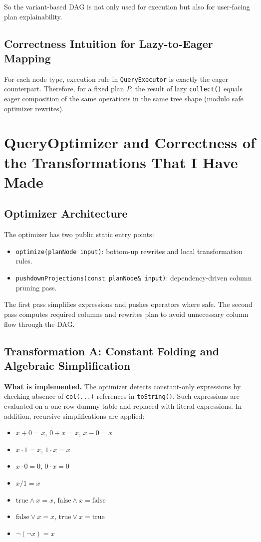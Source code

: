 \documentclass[11pt,a4paper]{article}
\begin{document}
So the variant-based DAG is not only used for execution but also for user-facing plan explainability.

\subsection{Correctness Intuition for Lazy-to-Eager Mapping}
For each node type, execution rule in \texttt{QueryExecutor} is exactly the eager counterpart. Therefore, for a fixed plan \(P\), the result of lazy \texttt{collect()} equals eager composition of the same operations in the same tree shape (modulo safe optimizer rewrites).

\section{QueryOptimizer and Correctness of the Transformations That I Have Made}

\subsection{Optimizer Architecture}
The optimizer has two public static entry points:
\begin{itemize}[leftmargin=*]
	\item \texttt{optimize(planNode input)}: bottom-up rewrites and local transformation rules.
	\item \texttt{pushdownProjections(const planNode\& input)}: dependency-driven column pruning pass.
\end{itemize}

The first pass simplifies expressions and pushes operators where safe. The second pass computes required columns and rewrites plan to avoid unnecessary column flow through the DAG.

\subsection{Transformation A: Constant Folding and Algebraic Simplification}

\textbf{What is implemented.}
The optimizer detects constant-only expressions by checking absence of \texttt{col(...)} references in \texttt{toString()}. Such expressions are evaluated on a one-row dummy table and replaced with literal expressions. In addition, recursive simplifications are applied:
\begin{itemize}[leftmargin=*]
	\item \(x + 0 = x\), \(0 + x = x\), \(x - 0 = x\)
	\item \(x \cdot 1 = x\), \(1 \cdot x = x\)
	\item \(x \cdot 0 = 0\), \(0 \cdot x = 0\)
	\item \(x / 1 = x\)
	\item \(\text{true} \land x = x\), \(\text{false} \land x = \text{false}\)
	\item \(\text{false} \lor x = x\), \(\text{true} \lor x = \text{true}\)
	\item \(\neg(\neg x) = x\)
\end{itemize}
\end{document}
